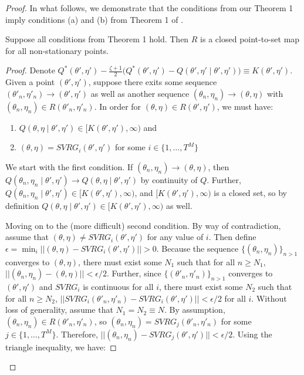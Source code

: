 \begin{proof}
In what follows, we demonstrate that the conditions from our Theorem 1 imply conditions (a) and (b) from Theorem 1 of \citet{Wu:1983}.

\begin{lemma}
    Suppose all conditions from Theorem 1 hold. Then $R$ is a closed point-to-set map for all non-stationary points.
\end{lemma}

\begin{proof}
     Denote $Q^*(\theta', \eta') - \frac{\zeta + 1}{2} \Big( Q^*(\theta', \eta') - Q(\theta', \eta' \mid \theta', \eta') \Big) \equiv K(\theta',\eta')$. Given a point $(\theta',\eta')$, suppose there exits some sequence $(\theta'_{n},\eta'_{n}) \to (\theta',\eta')$ as well as another sequence $(\theta_{n},\eta_{n}) \to (\theta,\eta)$ with $(\theta_{n},\eta_{n}) \in R(\theta'_{n},\eta'_{n})$. In order for $(\theta,\eta) \in R(\theta',\eta')$, we must have:
    \begin{enumerate}
        \item $Q(\theta, \eta \mid \theta', \eta') \in [K(\theta',\eta'),\infty)$ and
        \item $(\theta,\eta) = SVRG_i(\theta',\eta')$ for some $i \in \{1,\ldots,T^M\}$
    \end{enumerate}
    We start with the first condition. If $(\theta_{n},\eta_{n}) \to (\theta,\eta)$, then $Q(\theta_{n},\eta_{n} \mid \theta',\eta') \to Q(\theta,\eta \mid \theta',\eta')$ by continuity of $Q$. Further, $Q(\theta_{n},\eta_{n} \mid \theta',\eta') \in [K(\theta',\eta'),\infty)$, and $[K(\theta',\eta'),\infty)$ is a closed set, so by definition $Q(\theta,\eta \mid \theta',\eta') \in [K(\theta',\eta'),\infty)$ as well.
    
    Moving on to the (more difficult) second condition. By way of contradiction, assume that $(\theta,\eta) \neq SVRG_i(\theta',\eta')$ for any value of $i$. Then define $\epsilon = \min_i ||(\theta,\eta) - SVRG_i(\theta',\eta')|| > 0$. Because the sequence $\{(\theta_n,\eta_n)\}_{n>1}$ converges to $(\theta,\eta)$, there must exist some $N_1$ such that for all $n \geq N_1$, $||(\theta_{n},\eta_{n}) - (\theta,\eta)|| < \epsilon/2$. Further, since $\{(\theta'_n,\eta'_n)\}_{n>1}$ converges to $(\theta',\eta')$ and $SVRG_i$ is continuous for all $i$, there must exist some $N_2$ such that for all $n \geq N_2$, $||SVRG_i(\theta'_{n},\eta'_{n}) - SVRG_i(\theta',\eta')|| < \epsilon/2$ for all $i$. Without loss of generality, assume that $N_1 = N_2 \equiv N$. By assumption, $(\theta_{n},\eta_{n}) \in R(\theta'_{n},\eta'_{n})$, so $(\theta_{n},\eta_{n}) = SVRG_j(\theta'_{n},\eta'_{n})$ for some $j \in \{1,\ldots,T^M\}$. Therefore, $||(\theta_{n},\eta_{n}) - SVRG_j(\theta',\eta')|| < \epsilon/2$. Using the triangle inequality, we have:
    

\end{proof}
\end{proof}
